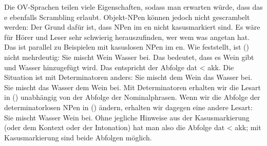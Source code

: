 Die OV-Sprachen teilen viele Eigenschaften, sodass man erwarten würde, dass das e ebenfalls Scrambling
erlaubt. Objekt-NPen können jedoch nicht gescrambelt werden:
\z
Der Grund dafür ist, dass NPen im en nicht kasusmarkiert sind. Es wäre für Hörer
und Leser sehr schwierig herauszufinden, wer wem was angetan hat. Das ist parallel zu Beispielen mit kasuslosen NPen im
en. Wie \citet[]{Wegener85b} feststellt, ist () nicht mehrdeutig:
\ea
\label{ex-sie-mischt-dem-wein-wasser-bei}
Sie mischt Wein Wasser bei.
\z
Das bedeutet, dass es Wein gibt und Wasser hinzugefügt wird. Das entspricht der Abfolge dat < akk.
Die Situation ist mit Determinatoren anders:
\eal
\ex
Sie mischt dem Wein das Wasser bei.
\ex
Sie mischt das Wasser dem Wein bei.
\zl
Mit Determinatoren erhalten wir die Lesart in () unabhängig von der Abfolge der Nominalphrasen. Wenn
wir die Abfolge der determinatorlosen NPen in () ändern, erhalten wir dagegen eine andere Lesart:
\ea
Sie mischt Wasser Wein bei.
\z
Ohne jegliche Hinweise aus der Kasusmarkierung (oder dem Kontext oder der Intonation) hat man also die Abfolge dat < akk; mit
Kasusmarkierung sind beide Abfolgen möglich.
%
%
%
%
%

